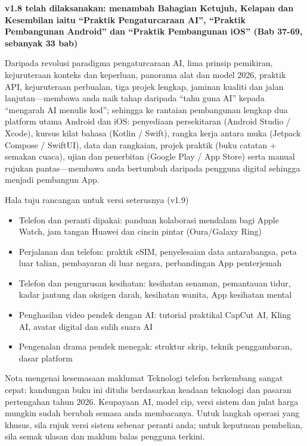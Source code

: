 

\textbf{v1.8 telah dilaksanakan: menambah Bahagian Ketujuh, Kelapan dan Kesembilan iaitu “Praktik Pengaturcaraan AI”, “Praktik Pembangunan Android” dan “Praktik Pembangunan iOS” (Bab 37-69, sebanyak 33 bab)}\par

Daripada revolusi paradigma pengaturcaraan AI, lima prinsip pemikiran, kejuruteraan konteks dan keperluan, panorama alat dan model 2026, praktik API, kejuruteraan perbualan, tiga projek lengkap, jaminan kualiti dan jalan lanjutan—membawa anda naik tahap daripada “tahu guna AI” kepada “mengarah AI menulis kod”; sehingga ke rantaian pembangunan lengkap dua platform utama Android dan iOS: penyediaan persekitaran (Android Studio / Xcode), kursus kilat bahasa (Kotlin / Swift), rangka kerja antara muka (Jetpack Compose / SwiftUI), data dan rangkaian, projek praktik (buku catatan + semakan cuaca), ujian dan penerbitan (Google Play / App Store) serta manual rujukan pantas—membawa anda bertumbuh daripada pengguna digital sehingga menjadi pembangun App.

\begin{tcbinfo}{Hala tuju rancangan untuk versi seterusnya (v1.9)}
\begin{itemize}
  \item Telefon dan peranti dipakai: panduan kolaborasi mendalam bagi Apple Watch, jam tangan Huawei dan cincin pintar (Oura/Galaxy Ring)
  \item Perjalanan dan telefon: praktik eSIM, penyelesaian data antarabangsa, peta luar talian, pembayaran di luar negara, perbandingan App penterjemah
  \item Telefon dan pengurusan kesihatan: kesihatan senaman, pemantauan tidur, kadar jantung dan oksigen darah, kesihatan wanita, App kesihatan mental
  \item Penghasilan video pendek dengan AI: tutorial praktikal CapCut AI, Kling AI, avatar digital dan sulih suara AI
  \item Pengenalan drama pendek menegak: struktur skrip, teknik penggambaran, dasar platform
\end{itemize}

\end{tcbinfo}

\begin{tcbwarn}{Nota mengenai kesemasaan maklumat}
Teknologi telefon berkembang sangat cepat; kandungan buku ini ditulis berdasarkan keadaan teknologi dan pasaran pertengahan tahun 2026. Keupayaan AI, model cip, versi sistem dan julat harga mungkin sudah berubah semasa anda membacanya. Untuk langkah operasi yang khusus, sila rujuk versi sistem sebenar peranti anda; untuk keputusan pembelian, sila semak ulasan dan maklum balas pengguna terkini.

\end{tcbwarn}
